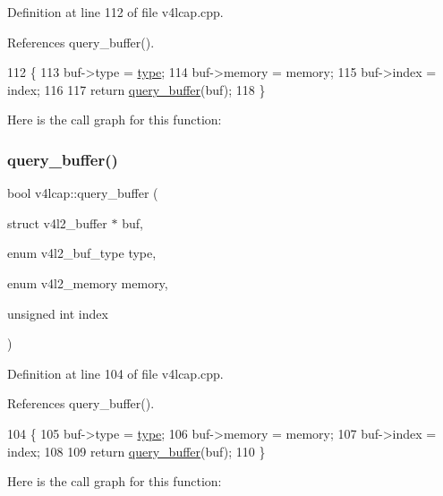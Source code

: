 Definition at line 112 of file v4lcap.\+cpp.



References query\+\_\+buffer().


\begin{DoxyCode}
112                                                                                                            
         \{
113     buf->type = \hyperlink{classstd_1_1conditional_1_1type}{type};
114     buf->memory = memory;
115     buf->index = index;
116 
117     \textcolor{keywordflow}{return} \hyperlink{classv4lcap_a238573a18b367ebc812a49f4f1917012}{query\_buffer}(buf);
118 \}
\end{DoxyCode}
Here is the call graph for this function\+:
\mbox{\label{classv4lcap_a6e853d36a5e4c7959f36cc0669389c4a}} 
\subsubsection{\texorpdfstring{query\+\_\+buffer()}{query\_buffer()}\hspace{0.1cm}{\footnotesize\ttfamily [3/3]}}
{\footnotesize\ttfamily bool v4lcap\+::query\+\_\+buffer (\begin{DoxyParamCaption}\item[{struct v4l2\+\_\+buffer $\ast$}]{buf,  }\item[{enum v4l2\+\_\+buf\+\_\+type}]{type,  }\item[{enum v4l2\+\_\+memory}]{memory,  }\item[{unsigned int}]{index }\end{DoxyParamCaption})}



Definition at line 104 of file v4lcap.\+cpp.



References query\+\_\+buffer().


\begin{DoxyCode}
104                                                                                                            
                   \{
105     buf->type = \hyperlink{classstd_1_1conditional_1_1type}{type};
106     buf->memory = memory;
107     buf->index = index;
108 
109     \textcolor{keywordflow}{return} \hyperlink{classv4lcap_a238573a18b367ebc812a49f4f1917012}{query\_buffer}(buf);
110 \}
\end{DoxyCode}
Here is the call graph for this function\+:
\mbox{\label{classv4lcap_aff4ca1e9742c8659582810529b8c9a2c}} 
